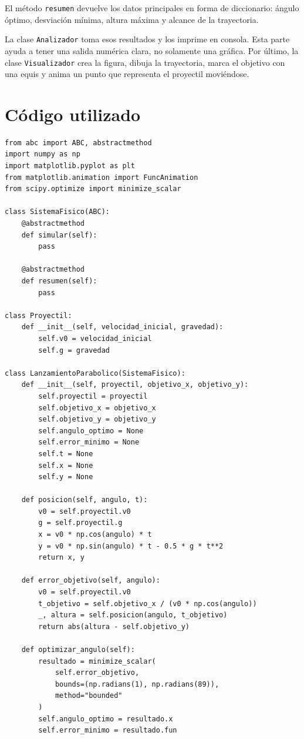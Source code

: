 \documentclass[12pt,letterpaper]{article}
\begin{document}
El m\'{e}todo \texttt{resumen} devuelve los datos principales en forma de diccionario: \'{a}ngulo \'{o}ptimo, desviaci\'{o}n m\'{i}nima, altura m\'{a}xima y alcance de la trayectoria.

La clase \texttt{Analizador} toma esos resultados y los imprime en consola. Esta parte ayuda a tener una salida num\'{e}rica clara, no solamente una gr\'{a}fica. Por \'{u}ltimo, la clase \texttt{Visualizador} crea la figura, dibuja la trayectoria, marca el objetivo con una equis y anima un punto que representa el proyectil movi\'{e}ndose.

\section{C\'{o}digo utilizado}

\begin{lstlisting}[style=pythonstyle]
from abc import ABC, abstractmethod
import numpy as np
import matplotlib.pyplot as plt
from matplotlib.animation import FuncAnimation
from scipy.optimize import minimize_scalar

class SistemaFisico(ABC):
    @abstractmethod
    def simular(self):
        pass

    @abstractmethod
    def resumen(self):
        pass

class Proyectil:
    def __init__(self, velocidad_inicial, gravedad):
        self.v0 = velocidad_inicial
        self.g = gravedad

class LanzamientoParabolico(SistemaFisico):
    def __init__(self, proyectil, objetivo_x, objetivo_y):
        self.proyectil = proyectil
        self.objetivo_x = objetivo_x
        self.objetivo_y = objetivo_y
        self.angulo_optimo = None
        self.error_minimo = None
        self.t = None
        self.x = None
        self.y = None

    def posicion(self, angulo, t):
        v0 = self.proyectil.v0
        g = self.proyectil.g
        x = v0 * np.cos(angulo) * t
        y = v0 * np.sin(angulo) * t - 0.5 * g * t**2
        return x, y

    def error_objetivo(self, angulo):
        v0 = self.proyectil.v0
        t_objetivo = self.objetivo_x / (v0 * np.cos(angulo))
        _, altura = self.posicion(angulo, t_objetivo)
        return abs(altura - self.objetivo_y)

    def optimizar_angulo(self):
        resultado = minimize_scalar(
            self.error_objetivo,
            bounds=(np.radians(1), np.radians(89)),
            method="bounded"
        )
        self.angulo_optimo = resultado.x
        self.error_minimo = resultado.fun


\end{lstlisting}
\end{document}
